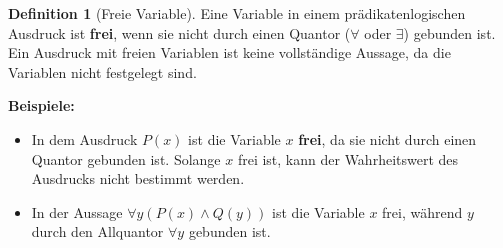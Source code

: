 \documentclass{book}
\theoremstyle{plain}
\theoremstyle{remark}
\theoremstyle{definition}
\newtheorem{definition}{Definition}[section]
\begin{document}
\begin{definition}[Freie Variable]
Eine Variable in einem prädikatenlogischen Ausdruck ist \textbf{frei}, wenn sie nicht durch einen Quantor (\(\forall\) oder \(\exists\)) gebunden ist. Ein Ausdruck mit freien Variablen ist keine vollständige Aussage, da die Variablen nicht festgelegt sind.

\textbf{Beispiele:}
\begin{itemize}
    \item In dem Ausdruck \(P(x)\) ist die Variable \(x\) \textbf{frei}, da sie nicht durch einen Quantor gebunden ist. Solange \(x\) frei ist, kann der Wahrheitswert des Ausdrucks nicht bestimmt werden.
    
    \item In der Aussage \(\forall y (P(x) \land Q(y))\) ist die Variable \(x\) frei, während \(y\) durch den Allquantor \(\forall y\) gebunden ist.
\end{itemize}
\end{definition}
\end{document}
